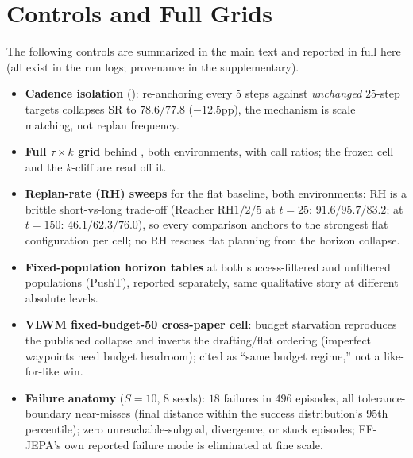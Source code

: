 \documentclass{article}
\begin{document}
\section{Controls and Full Grids}
\label{app:controls}
The following controls are summarized in the main text and reported in full here (all
exist in the run logs; provenance in the supplementary).
\begin{itemize}[itemsep=1pt,topsep=2pt]
\item \textbf{Cadence isolation} (): re-anchoring every $5$ steps
against \emph{unchanged} $25$-step targets collapses SR to $78.6/77.8$ ($-12.5$pp), the mechanism is scale matching, not replan frequency.
\item \textbf{Full $\tau{\times}k$ grid} behind , both environments,
with call ratios; the frozen cell and the $k$-cliff are read off it.
\item \textbf{Replan-rate (RH) sweeps} for the flat baseline, both environments: RH is a
brittle short-vs-long trade-off (Reacher RH$1/2/5$ at $t{=}25$: $91.6/95.7/83.2$; at
$t{=}150$: $46.1/62.3/76.0$), so every comparison anchors to the strongest flat
configuration per cell; no RH rescues flat planning from the horizon collapse.
\item \textbf{Fixed-population horizon tables} at both success-filtered and unfiltered
populations (PushT), reported separately, same qualitative story at different absolute
levels.
\item \textbf{VLWM fixed-budget-50 cross-paper cell}: budget starvation reproduces the
published collapse and inverts the drafting/flat ordering (imperfect waypoints need
budget headroom); cited as ``same budget regime,'' not a like-for-like win.
\item \textbf{Failure anatomy} ($S{=}10$, 8 seeds): $18$ failures in $496$ episodes, all
tolerance-boundary near-misses (final distance within the success distribution's 95th
percentile); zero unreachable-subgoal, divergence, or stuck episodes; FF-JEPA's own
reported failure mode is eliminated at fine scale.
\end{itemize}



\end{document}
